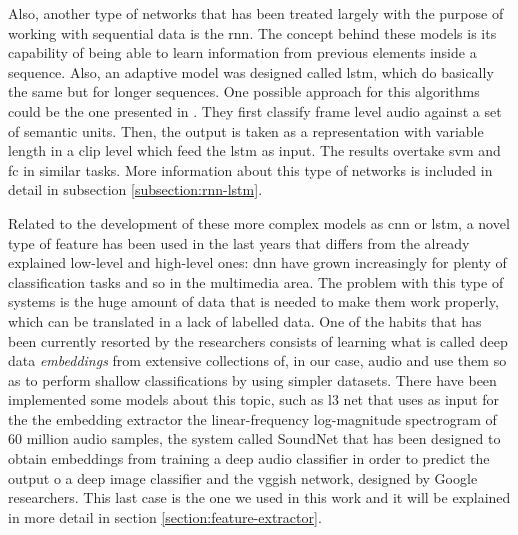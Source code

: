 	Also, another type of networks that has been treated largely with the purpose of working with sequential data is the \acrfull{rnn}. The concept behind these models is its capability of being able to learn information from previous elements inside a sequence. Also, an adaptive model was designed called \acrshort{lstm}, which do basically the same but for longer sequences. One possible approach for this algorithms could be the one presented in \cite{Wang2016}. They first classify frame level audio against a set of semantic units. Then, the output is taken as a representation with variable length in a clip level which feed the \acrshort{lstm} as input. The results overtake \acrshort{svm} and \acrshort{fc} in similar tasks. More information about this type of networks is included in detail in subsection \ref{subsection:rnn-lstm}.
	
	Related to the development of these more complex models as \acrshort{cnn} or \acrshort{lstm}, a novel type of feature has been used in the last years that differs from the already explained low-level and high-level ones: \acrfull{dnn} have grown increasingly for plenty of classification tasks and so in the multimedia area. The problem with this type of systems is the huge amount of data that is needed to make them work properly, which can be translated in a lack of labelled data. One of the habits that has been currently resorted by the researchers consists of learning what is called deep data \textit{embeddings} from extensive collections of, in our case, audio and use them so as to perform shallow classifications by using simpler datasets. There have been implemented some models about this topic, such as \acrfull{l3} \cite{Cramer2019} net that uses as input for the the embedding extractor the linear-frequency log-magnitude spectrogram of 60 million audio samples, the system called SoundNet \cite{Aytar2016} that has been designed to obtain embeddings from training a deep audio classifier in order to predict the output o a deep image classifier and the \acrshort{vgg}ish network, designed by Google researchers. This last case is the one we used in this work and it will be explained in more detail in section \ref{section:feature-extractor}.
	
	
	
	
